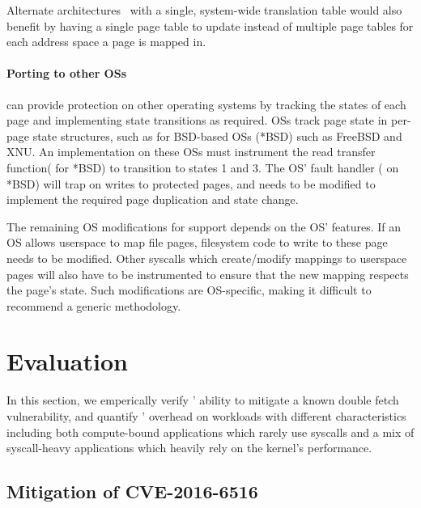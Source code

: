 Alternate architectures~\cite{0003BOBFP21midgard,ChaseLFL94SASOS} with a single,
system-wide translation table
would also benefit \midas by having a single page table to
update instead of multiple page tables for each address space a page
is mapped in.

\paragraph{Porting to other OSs}
\midas can provide \tocttou protection on other operating systems by
tracking the states of each page and implementing state transitions
as required.
OSs track page state in per-page state structures,
such as  for BSD-based OSs (*BSD) such as FreeBSD and XNU.
An implementation on these OSs must instrument the
read transfer function( for *BSD) to transition to states 1 and 3.
The OS' fault handler ( on *BSD) will trap on writes to
protected pages, and needs to be modified to implement the required page
duplication and state change.

The remaining OS modifications for \midas support depends on
the OS' features.
If an OS allows userspace to map file pages, filesystem code to write
to these page needs to be modified.
Other syscalls which create/modify mappings to userspace pages will
also have to be instrumented to ensure that the new mapping respects the
page's state.
Such modifications are OS-specific, making it difficult to recommend
a generic methodology.


\section{Evaluation}

In this section, we emperically verify \midas' ability to mitigate
a known double fetch vulnerability, and quantify \midas' overhead on
workloads with different characteristics including both compute-bound
applications which rarely use syscalls and a mix of syscall-heavy applications
which heavily rely on the kernel's performance.

\subsection{Mitigation of CVE-2016-6516}

